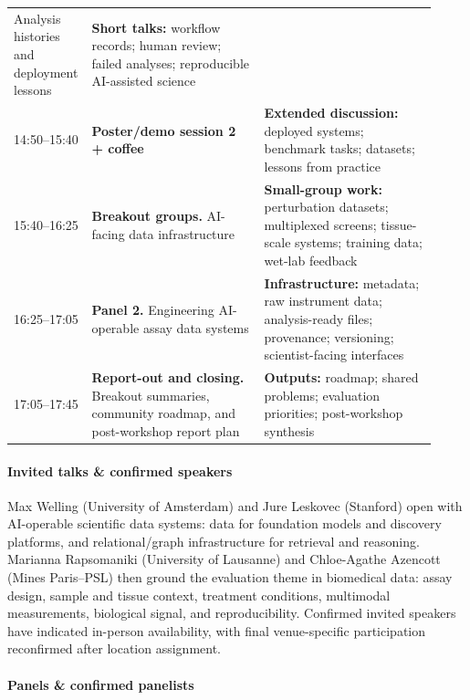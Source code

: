 \documentclass[10pt]{article}
\begin{document}
\begin{table}[htb!]
\begin{tabular}{@{}p{0.12\linewidth}p{0.4\linewidth}p{0.4\linewidth}@{}}
Analysis histories and deployment lessons &
\textbf{Short talks:} workflow records; human review; failed analyses; reproducible AI-assisted science \\

14:50--15:40 &
\textbf{Poster/demo session 2 + coffee} &
\textbf{Extended discussion:} deployed systems; benchmark tasks; datasets; lessons from practice \\

15:40--16:25 &
\textbf{Breakout groups.} AI-facing data infrastructure &
\textbf{Small-group work:} perturbation datasets; multiplexed screens; tissue-scale systems; training data; wet-lab feedback \\

16:25--17:05 &
\textbf{Panel 2.} Engineering AI-operable assay data systems &
\textbf{Infrastructure:} metadata; raw instrument data; analysis-ready files; provenance; versioning; scientist-facing interfaces \\

17:05--17:45 &
\textbf{Report-out and closing.} Breakout summaries, community roadmap, and post-workshop report plan &
\textbf{Outputs:} roadmap; shared problems; evaluation priorities; post-workshop synthesis \\

\bottomrule
\end{tabular}
\end{table}
\vspace{-2pt}

\paragraph{Invited talks \& confirmed speakers}
\label{sec:speakers}

Max Welling (University of Amsterdam) and Jure Leskovec (Stanford) open with AI-operable scientific data systems: data for foundation models and discovery platforms, and relational/graph infrastructure for retrieval and reasoning. Marianna Rapsomaniki (University of Lausanne) and Chloe-Agathe Azencott (Mines Paris–PSL) then ground the evaluation theme in biomedical data: assay design, sample and tissue context, treatment conditions, multimodal measurements, biological signal, and reproducibility. Confirmed invited speakers have indicated in-person availability, with final venue-specific participation reconfirmed after location assignment.

\paragraph{Panels \& confirmed panelists}
\label{sec:panels}
\end{document}
